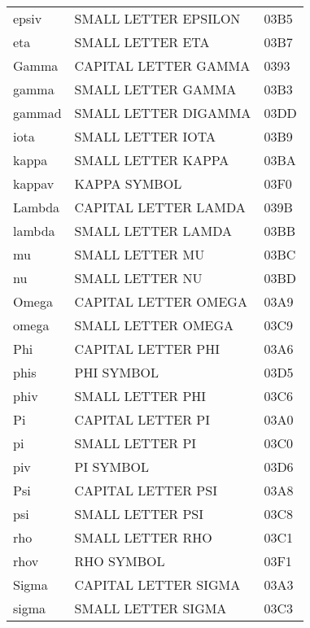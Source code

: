 \begin{longtable}{lll}
epsiv              &  SMALL LETTER EPSILON          & 03B5\\
eta                &  SMALL LETTER ETA              & 03B7\\
Gamma              &  CAPITAL LETTER GAMMA          & 0393\\
gamma              &  SMALL LETTER GAMMA            & 03B3\\
gammad             &  SMALL LETTER DIGAMMA          & 03DD\\
iota               &  SMALL LETTER IOTA             & 03B9\\
kappa              &  SMALL LETTER KAPPA            & 03BA\\
kappav             &  KAPPA SYMBOL                  & 03F0\\
Lambda             &  CAPITAL LETTER LAMDA          & 039B\\
lambda             &  SMALL LETTER LAMDA            & 03BB\\
mu                 &  SMALL LETTER MU               & 03BC\\
nu                 &  SMALL LETTER NU               & 03BD\\
Omega              &  CAPITAL LETTER OMEGA          & 03A9\\
omega              &  SMALL LETTER OMEGA            & 03C9\\
Phi                &  CAPITAL LETTER PHI            & 03A6\\
phis               &  PHI SYMBOL                    & 03D5\\
phiv               &  SMALL LETTER PHI              & 03C6\\
Pi                 &  CAPITAL LETTER PI             & 03A0\\
pi                 &  SMALL LETTER PI               & 03C0\\
piv                &  PI SYMBOL                     & 03D6\\
Psi                &  CAPITAL LETTER PSI            & 03A8\\
psi                &  SMALL LETTER PSI              & 03C8\\
rho                &  SMALL LETTER RHO              & 03C1\\
rhov               &  RHO SYMBOL                    & 03F1\\
Sigma              &  CAPITAL LETTER SIGMA          & 03A3\\
sigma              &  SMALL LETTER SIGMA            & 03C3\\

\end{longtable}
